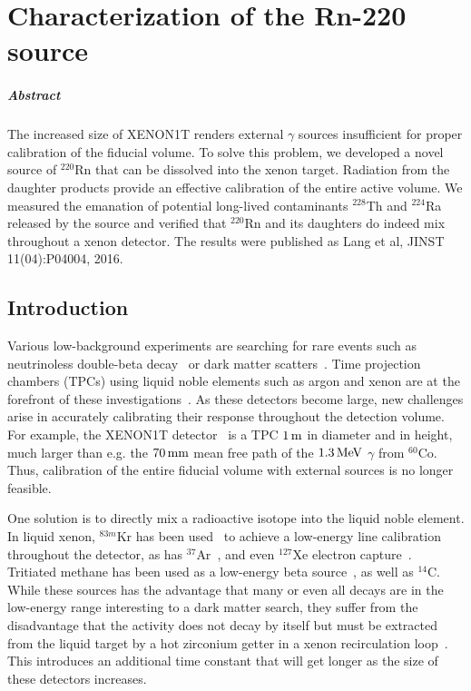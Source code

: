 
\chapter{Characterization of the Rn-220 source}\label{ch:rn220}

\paragraph{Abstract} The increased size of XENON1T renders external $\gamma$ sources insufficient for proper calibration of the fiducial volume. To solve this problem, we developed a novel source of $^{220}$Rn that can be dissolved into the xenon target. Radiation from the daughter products provide an effective calibration of the entire active volume. We measured the emanation of potential long-lived contaminants $^{228}$Th and $^{224}$Ra released by the source and verified that $^{220}$Rn and its daughters do indeed mix throughout a xenon detector. The results were published as Lang et al, JINST 11(04):P04004, 2016.

\section{Introduction}

Various low-background experiments are searching for rare events such as neutrinoless double-beta decay~\cite{Pandola:2014naa} or dark matter scatters~\cite{Undagoitia:2015gya}. Time projection chambers (TPCs) using liquid noble elements such as argon and xenon are at the forefront of these investigations~\cite{Albert:2015eem,Aprile:2015uzo,Akerib:2015rjg,Amaudruz:2014nsa,Calvo:2015uln,Agnes:2015ftt}. As these detectors become large, new challenges arise in accurately calibrating their response throughout the detection volume. For example, the XENON1T detector~\cite{Aprile:2015uzo} is a TPC $1\,\mathrm{m}$ in diameter and in height, much larger than e.g. the $70\,\mathrm{mm}$ mean free path of the $1.3\,\mathrm{MeV}$ $\gamma$ from $^{60}$Co. Thus, calibration of the entire fiducial volume with external sources is no longer feasible.

One solution is to directly mix a radioactive isotope into the liquid noble element. In liquid xenon, $^{83m}$Kr has been used~\cite{Akerib:2017eql} to achieve a low-energy line calibration throughout the detector, as has $^{37}$Ar~\cite{Boulton:2017hub}, and even $^{127}$Xe electron capture~\cite{Akerib:2017hph}. Tritiated methane has been used as a low-energy beta source~\cite{Akerib:2015wdi}, as well as $^{14}$C. While these sources has the advantage that many or even all decays are in the low-energy range interesting to a dark matter search, they suffer from the disadvantage that the activity does not decay by itself but must be extracted from the liquid target by a hot zirconium getter in a xenon recirculation loop~\cite{Akerib:2015wdi}. This introduces an additional time constant that will get longer as the size of these detectors increases.


